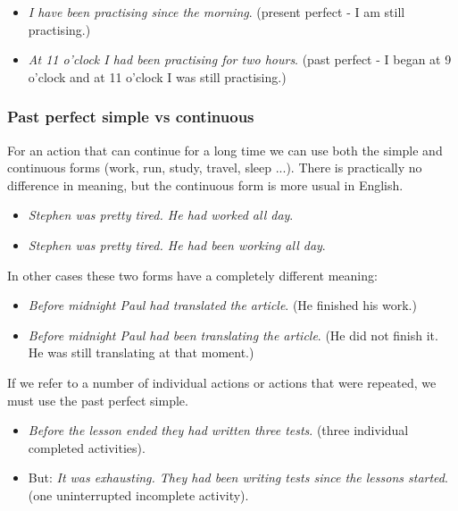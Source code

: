 \begin{itemize}

\item \textit{I have been practising since the morning}. (present perfect - I am still practising.)
\item \textit{At 11 o'clock I had been practising for two hours}. (past perfect - I began at 9 o'clock and at 11 o'clock I was still practising.)
\end{itemize}

\subsubsection{Past perfect simple vs continuous}

For an action that can continue for a long time we can use both the simple and continuous forms (work, run, study, travel, sleep ...). There is practically no difference in meaning, but the continuous form is more usual in English. 

\begin{itemize}
\item \textit{Stephen was pretty tired. He had worked all day}.
\item \textit{Stephen was pretty tired. He had been working all day}.
\end{itemize}

In other cases these two forms have a completely different meaning:

\begin{itemize}
\item \textit{Before midnight Paul had translated the article}. (He finished his work.) 
\item \textit{Before midnight Paul had been translating the article}. (He did not finish it. He was still translating at that moment.)
\end{itemize}

If we refer to a number of individual actions or actions that were repeated, we must use the past perfect simple.

\begin{itemize}
\item \textit{Before the lesson ended they had written three tests}. (three individual completed activities).
\item But: \textit{It was exhausting. They had been writing tests since the lessons started}.  (one uninterrupted incomplete activity). 
\end{itemize}

